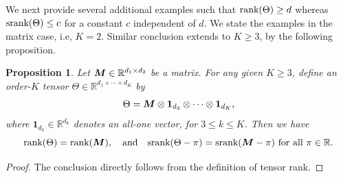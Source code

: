 \documentclass[11pt]{article}
\theoremstyle{plain}
\newtheorem{prop}{Proposition}[section]
\theoremstyle{definition}
\def\srank{\textup{srank}}
\def\rank{\textup{rank}}
\begin{document}
We next provide several additional examples such that $\rank(\Theta)\geq d$ whereas $\srank(\Theta)\leq c$ for a constant $c$ independent of $d$. We state the examples in the matrix case, i.e, $K=2$. Similar conclusion extends to $K\geq 3$, by the following proposition. 
\begin{prop} Let $\bm M\in\mathbb{R}^{d_1\times d_2}$ be a matrix. For any given $K\geq 3$, define an order-$K$ tensor $\Theta\in\mathbb{R}^{d_1\times \cdots \times d_K}$ by
\[
\Theta=\bm M\otimes \mathbf{1}_{d_3}\otimes \cdots \otimes \mathbf{1}_{d_K},
\] 
where $\mathbf{1}_{d_k}\in\mathbb{R}^{d_k}$ denotes an all-one vector, for $3\leq k\leq K$. Then we have
\[
\rank(\Theta)=\rank(\mM),\quad \text{and}\quad \srank(\Theta-\pi)=\srank(\mM-\pi) \ \text{for all $\pi\in\mathbb{R}$}.
\] 
\end{prop}
\begin{proof}
The conclusion directly follows from the definition of tensor rank. 
\end{proof}
\end{document}
